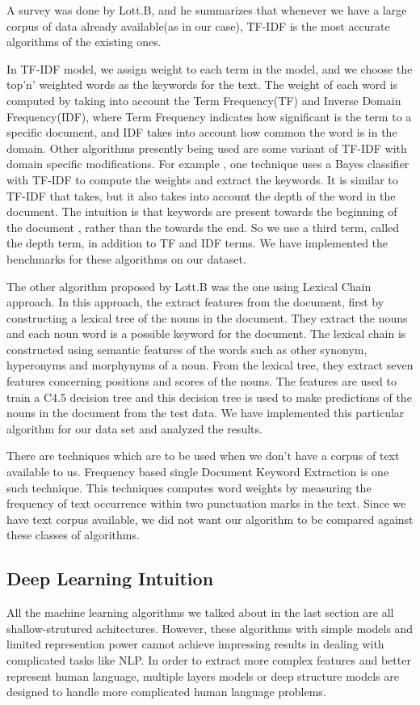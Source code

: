 \documentclass[dvips,9pt]{article}
\begin{document}
		A survey was done by Lott.B\cite{lott2012survey}, and he summarizes that whenever we have a large corpus of data already available(as in our case), TF-IDF is the most accurate algorithms of the existing ones. 
		
		In TF-IDF model, we assign weight to each term in the model, and we choose the top'n' weighted words as the keywords for the text. The weight of each word is computed by taking into account the Term Frequency(TF) and Inverse Domain Frequency(IDF), where Term Frequency indicates how significant is the term to a specific document, and IDF takes into account how common the word is in the domain. 	Other algorithms presently being used are some variant of TF-IDF with domain specific modifications. For example , one technique uses a Bayes classifier with TF-IDF to compute the weights and extract the keywords. It is similar to TF-IDF that takes, but it also takes into account the depth of the word in the document. The intuition is that keywords are present towards the beginning of the document , rather than the towards the end. So we use a third term, called the depth term, in addition to TF and IDF terms. We have implemented the benchmarks for these algorithms on our dataset.
		
		The other algorithm proposed by Lott.B\cite{lott2012survey} was the one using Lexical Chain approach. In this approach, the extract features from the document, first by constructing a lexical tree of the nouns in the document. They extract the nouns and each noun word is a possible keyword for the document. The lexical chain is constructed using semantic features of the words such as other synonym, hyperonyms and morphynyms of a noun. From the lexical tree, they extract seven features concerning positions and scores of the nouns. The features are used to train a C4.5 decision tree and this decision tree is used to make predictions of the nouns in the document from the test data. We have implemented this particular algorithm for our data set and analyzed the results.		

		There are techniques which are to be used when we don't have a corpus of text available to us. Frequency based single Document Keyword Extraction is one such technique. This techniques computes word weights by measuring the frequency of text occurrence within two punctuation marks in the text. Since we have text corpus available, we did not want our algorithm to be compared against these classes of algorithms.
		\subsection{Deep Learning Intuition}
		All the machine learning algorithms we talked about in the last section are all shallow-strutured achitectures. However, these algorithms with simple models and limited represention power cannot achieve impressing results in dealing with complicated tasks like NLP. In order to extract more complex features and better represent human language, multiple layers models or deep structure models are designed to handle more  complicated human language problems.
\end{document}
